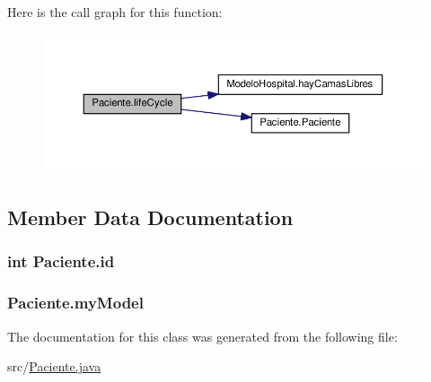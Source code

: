 Here is the call graph for this function\-:\nopagebreak
\begin{figure}[H]
\begin{center}
\leavevmode
\includegraphics[width=350pt]{class_paciente_ac58de1ac716ab3f57e24b82a670c29d5_cgraph}
\end{center}
\end{figure}




\subsection{Member Data Documentation}
\hypertarget{class_paciente_aa05bc33a654eef666530777484f07604}{
\subsubsection[{id}]{\setlength{\rightskip}{0pt plus 5cm}int Paciente.\-id\hspace{0.3cm}{\ttfamily [private]}}}\label{class_paciente_aa05bc33a654eef666530777484f07604}
\hypertarget{class_paciente_a3fcfcbed59d2868e9c98dcf6eae42ffa}{
\subsubsection[{my\-Model}]{ Paciente.\-my\-Model\hspace{0.3cm}{\ttfamily [private]}}}\label{class_paciente_a3fcfcbed59d2868e9c98dcf6eae42ffa}


The documentation for this class was generated from the following file\-:\begin{DoxyCompactItemize}
\item 
src/\hyperlink{_paciente_8java}{Paciente.\-java}\end{DoxyCompactItemize}
